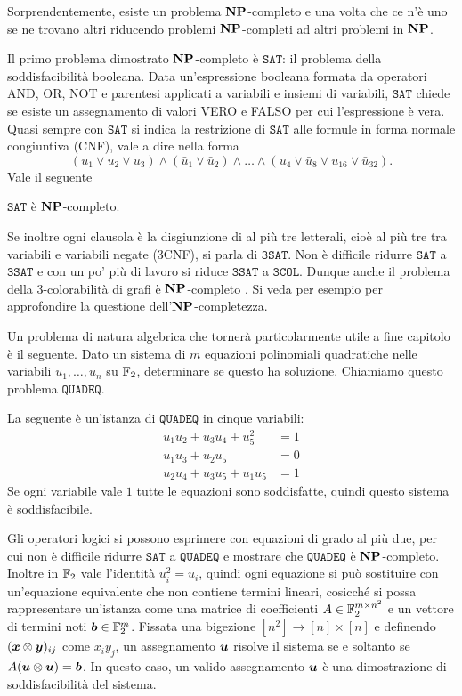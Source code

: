 Sorprendentemente, esiste un problema $\mathbf{NP}$-completo e una volta che ce n'è uno
se ne trovano altri riducendo problemi $\mathbf{NP}$-completi ad altri problemi in $\mathbf{NP}$.

Il primo problema dimostrato $\mathbf{NP}$-completo è $\mathtt{SAT}$: il
problema della soddisfacibilità booleana. Data un'espressione booleana
formata da operatori AND, OR, NOT e parentesi applicati a variabili e insiemi
di variabili, $\mathtt{SAT}$ chiede se esiste un assegnamento di valori VERO e
FALSO per cui l'espressione è vera.
Quasi sempre con $\mathtt{SAT}$ si indica la restrizione di $\mathtt{SAT}$ alle
formule in forma normale congiuntiva (CNF), vale a dire nella forma
\[
	(u_1 \lor u_2 \lor u_3) \land (\bar u_1 \lor \bar u_2) \land
	\ldots \land (u_4 \lor \bar u_8 \lor u_{16} \lor \bar u_{32}).
\]
Vale il seguente

\begin{theorem} \label{thm:cook-levin}
	$\mathtt{SAT}$ è $\mathbf{NP}$-completo.
\end{theorem}

Se inoltre ogni clausola è la disgiunzione di al più tre letterali, cioè al
più tre tra variabili e variabili negate (3CNF), si parla di $\mathtt{3SAT}$.
Non è difficile ridurre $\mathtt{SAT}$ a $\mathtt{3SAT}$ e con un po' più
di lavoro si riduce $\mathtt{3SAT}$ a $\mathtt{3COL}$. Dunque anche il problema
della 3-colorabilità di grafi è $\mathbf{NP}$-completo \cite{Karp72, Stockmeyer73}.
Si veda per esempio \cite{GJ79} per approfondire la questione
dell'$\mathbf{NP}$-completezza.

Un problema di natura algebrica che tornerà particolarmente utile a fine
capitolo è il seguente.
Dato un sistema di $m$ equazioni polinomiali quadratiche nelle variabili
$u_1, \ldots, u_n$ su $\mathbb{F}_2$, determinare se questo ha soluzione.
Chiamiamo questo problema $\mathtt{QUADEQ}$.

\begin{example}
	La seguente è un'istanza di $\mathtt{QUADEQ}$ in cinque variabili:
	\begin{align*}
		u_1 u_2 + u_3 u_4 + u_5^2 &= 1\\
		u_1 u_3 + u_2 u_5 &= 0 \\
		u_2 u_4 + u_3 u_5 + u_1 u_5 &= 1
	\end{align*}
	Se ogni variabile vale $1$ tutte le equazioni sono soddisfatte,
	quindi questo sistema è soddisfacibile.
\end{example}

Gli operatori logici si possono esprimere con equazioni di grado al più due,
per cui non è difficile ridurre $\mathtt{SAT}$ a $\mathtt{QUADEQ}$ e mostrare
che $\mathtt{QUADEQ}$ è $\mathbf{NP}$-completo.
Inoltre in $\mathbb{F}_2$ vale l'identità $u_i^2 = u_i$, quindi ogni equazione
si può sostituire con un'equazione equivalente che non contiene
termini lineari, cosicché si possa rappresentare un'istanza come una matrice
di coefficienti $A \in \mathbb{F}_2^{m \times n^2}$ e un vettore di termini noti
$\bm{b} \in \mathbb{F}_2^m$. Fissata una bigezione $[n^2] \to [n] \times [n]$
e definendo $(\bm{x} \otimes \bm{y})_{ij}$ come $x_i y_j$, un
assegnamento $\bm{u}$ risolve il sistema se e soltanto se
$A (\bm{u} \otimes \bm{u}) = \bm{b}$.
In questo caso, un valido assegnamento $\bm{u}$ è una dimostrazione di
soddisfacibilità del sistema.

